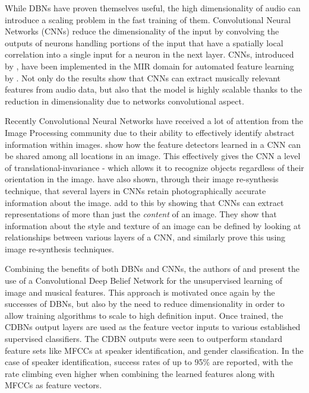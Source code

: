 \documentclass[12pt]{article}
\begin{document}
While DBNs have proven themselves useful, the high dimensionality of audio can introduce a scaling problem in the fast training of them. Convolutional Neural Networks (CNNs) reduce the dimensionality of the input by convolving the outputs of neurons handling portions of the input that have a spatially local correlation into a single input for a neuron in the next layer. CNNs, introduced by \citet{atlas1988artificial}, have been implemented in the MIR domain for automated feature learning by \citet{li2010automatic}. Not only do the results show that CNNs can extract musically relevant features from audio data, but also that the model is highly scalable thanks to the reduction in dimensionality due to networks convolutional aspect.

Recently Convolutional Neural Networks have received a lot of attention from the Image Processing community due to their ability to effectively identify abstract information within images. \citet{lee2009convolutional} show how the feature detectors learned in a CNN can be shared among all locations in an image. This effectively gives the CNN a level of translational-invariance - which allows it to recognize objects regardless of their orientation in the image. \citet{mahendran2015understanding} have also shown, through their image re-synthesis technique, that several layers in CNNs retain photographically accurate information about the image. \citet{gatys2015neural} add to this by showing that CNNs can extract representations of more than just the \emph{content} of an image. They show that information about the style and texture of an image can be defined by looking at relationships between various layers of a CNN, and similarly prove this using image re-synthesis techniques.

Combining the benefits of both DBNs and CNNs, the authors of \citet{lee2009convolutional} and \citet{lee2009unsupervised} present the use of a Convolutional Deep Belief Network for the unsupervised learning of image and musical features. This approach is motivated once again by the successes of DBNs, but also by the need to reduce dimensionality in order to allow training algorithms to scale to high definition input. Once trained, the CDBNs output layers are used as the feature vector inputs to various established supervised classifiers. The CDBN outputs were seen to outperform standard feature sets like MFCCs at speaker identification, and gender classification. In the case of speaker identification, success rates of up to 95\% are reported, with the rate climbing even higher when combining the learned features along with MFCCs as feature vectors.
\end{document}
